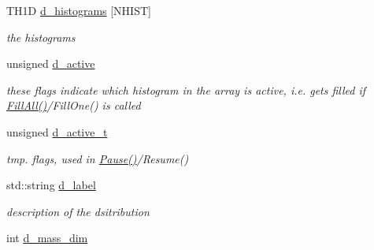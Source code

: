 \begin{DoxyCompactItemize}
\item 
\hypertarget{classHistArray_a53fda50a10b8ba766d44b789313c64c4}{T\-H1\-D \hyperlink{classHistArray_a53fda50a10b8ba766d44b789313c64c4}{d\-\_\-histograms} \mbox{[}N\-H\-I\-S\-T\mbox{]}}\label{classHistArray_a53fda50a10b8ba766d44b789313c64c4}

\begin{DoxyCompactList}\small\item\em the histograms \end{DoxyCompactList}\item 
\hypertarget{classHistArray_ae6faae6b22f5dc62ba9c664a93e8ea82}{unsigned \hyperlink{classHistArray_ae6faae6b22f5dc62ba9c664a93e8ea82}{d\-\_\-active}}\label{classHistArray_ae6faae6b22f5dc62ba9c664a93e8ea82}

\begin{DoxyCompactList}\small\item\em these flags indicate which histogram in the array is active, i.\-e. gets filled if \hyperlink{classHistArray_ae8d7189d1f2b9710a3228deac3eb1fa4}{Fill\-All()}/\-Fill\-One() is called \end{DoxyCompactList}\item 
\hypertarget{classHistArray_ac477be77aa121bf1cbeea842debb2579}{unsigned \hyperlink{classHistArray_ac477be77aa121bf1cbeea842debb2579}{d\-\_\-active\-\_\-t}}\label{classHistArray_ac477be77aa121bf1cbeea842debb2579}

\begin{DoxyCompactList}\small\item\em tmp. flags, used in \hyperlink{classHistArray_a27f9acb7029ec4c90b4476e5bc26037d}{Pause()}/\-Resume() \end{DoxyCompactList}\item 
\hypertarget{classHistArray_a273ef1bf687ee03dd17d106075bb07e2}{std\-::string \hyperlink{classHistArray_a273ef1bf687ee03dd17d106075bb07e2}{d\-\_\-label}}\label{classHistArray_a273ef1bf687ee03dd17d106075bb07e2}

\begin{DoxyCompactList}\small\item\em description of the dsitribution \end{DoxyCompactList}\item 
\hypertarget{classHistArray_ac682fdf0aeedf8f0b9fb8c4c4b1fee71}{int \hyperlink{classHistArray_ac682fdf0aeedf8f0b9fb8c4c4b1fee71}{d\-\_\-mass\-\_\-dim}}\label{classHistArray_ac682fdf0aeedf8f0b9fb8c4c4b1fee71}


\end{DoxyCompactItemize}
